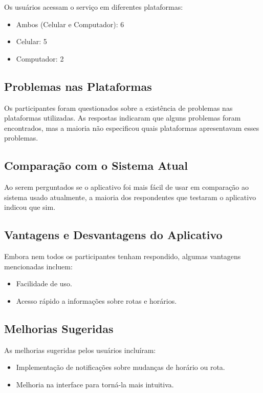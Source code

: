 \documentclass[
    12pt,                   %
    openright,              %
    oneside,                %
    a4paper,                %
    sumario=tradicional,    %
    english,                %
    brazil,                 %
    ]{abntex2}
\begin{document}
Os usuários acessam o serviço em diferentes plataformas:
\begin{itemize}
	\item Ambos (Celular e Computador): 6
	\item Celular: 5
	\item Computador: 2
\end{itemize}


\subsection{Problemas nas Plataformas}

Os participantes foram questionados sobre a existência de problemas nas plataformas utilizadas. As respostas indicaram que alguns problemas foram encontrados, mas a maioria não especificou quais plataformas apresentavam esses problemas.


\subsection{Comparação com o Sistema Atual}

Ao serem perguntados se o aplicativo foi mais fácil de usar em comparação ao sistema usado atualmente, a maioria dos respondentes que testaram o aplicativo indicou que sim.


\subsection{Vantagens e Desvantagens do Aplicativo}

Embora nem todos os participantes tenham respondido, algumas vantagens mencionadas incluem:
\begin{itemize}
	\item Facilidade de uso.
	\item Acesso rápido a informações sobre rotas e horários.
\end{itemize}


\subsection{Melhorias Sugeridas}

As melhorias sugeridas pelos usuários incluíram:
\begin{itemize}
	\item Implementação de notificações sobre mudanças de horário ou rota.
	\item Melhoria na interface para torná-la mais intuitiva.
\end{itemize}
\end{document}
